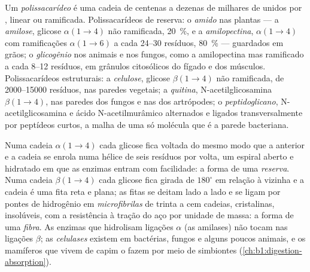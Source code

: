 \begin{definition}[Polissacarídeo]\label{def:b1:carbohydrates:polysaccharide}
Um \emph{polissacarídeo} é uma cadeia de centenas
a dezenas de milhares de  unidos por , linear ou ramificada. Polissacarídeos de reserva: o
\emph{amido} nas plantas --- a \emph{amilose}, glicose
$\alpha(1{\to}4)$ não ramificada, \qty{20}{\%}, e a
\emph{amilopectina}, $\alpha(1{\to}4)$ com ramificações
$\alpha(1{\to}6)$ a cada \qtyrange{24}{30}{} resíduos, \qty{80}{\%} ---
guardados em grãos; o \emph{glicogênio} nos animais e
nos fungos, como a amilopectina mas ramificado a cada
\qtyrange{8}{12}{} resíduos, em grânulos citosólicos do fígado e dos
músculos. Polissacarídeos estruturais: a
\emph{celulose}, glicose $\beta(1{\to}4)$ não
ramificada, de \qtyrange{2000}{15000}{} resíduos, nas paredes vegetais;
a \emph{quitina}, N-acetilglicosamina $\beta(1{\to}4)$,
nas paredes dos fungos e nas  dos artrópodes; o
\emph{peptidoglicano}, N-acetilglicosamina e ácido
N-acetilmurâmico alternados e ligados transversalmente por peptídeos
curtos, a malha de uma só molécula que é a parede bacteriana.
\end{definition}

\begin{proposition}\label{prop:b1:carbohydrates:alphabeta}
Numa cadeia $\alpha(1{\to}4)$ cada glicose fica voltada do mesmo modo
que a anterior e a cadeia se enrola numa hélice de seis resíduos por
volta, um espiral aberto e hidratado em que as enzimas entram com
facilidade: a forma de uma \emph{reserva}. Numa cadeia $\beta(1{\to}4)$
cada glicose fica girada de $180^\circ$ em relação à vizinha e a cadeia
é uma fita reta e plana; as fitas se deitam lado a lado e se ligam por
pontes de hidrogênio em \emph{microfibrilas} de trinta a cem cadeias,
cristalinas, insolúveis, com a resistência à tração do aço por unidade
de massa: a forma de uma \emph{fibra}. As enzimas que hidrolisam
ligações $\alpha$ (as amilases) não tocam nas ligações $\beta$; as
\emph{celulases} existem em bactérias, fungos e alguns poucos animais, e
os mamíferos que vivem de capim o fazem por meio de simbiontes
(\cref{ch:b1:digestion-absorption}).
\end{proposition}


